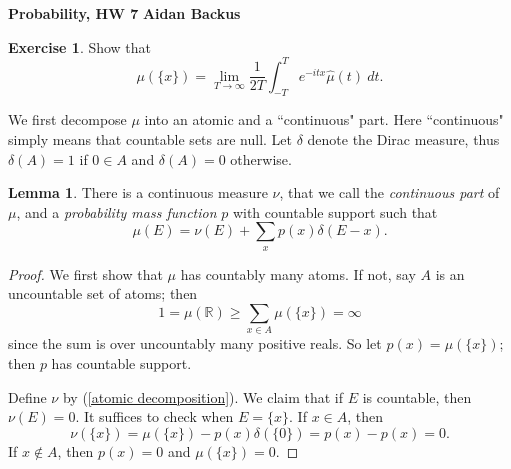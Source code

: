 \documentclass[10pt]{article}
\newcommand{\RR}{\mathbb{R}}
\theoremstyle{definition}
\newtheorem{exer}{Exercise}
\newtheorem{lemma}{Lemma}[exer]
\begin{document}
\noindent
\large\textbf{Probability, HW 7} \hfill \textbf{Aidan Backus} \\



\begin{exer}
Show that
$$\mu(\{x\}) = \lim_{T \to \infty} \frac{1}{2T} \int_{-T}^T e^{-itx} \hat \mu(t) ~dt.$$
\end{exer}

We first decompose $\mu$ into an atomic and a ``continuous" part.
Here ``continuous" simply means that countable sets are null.
Let $\delta$ denote the Dirac measure, thus $\delta(A) = 1$ if $0 \in A$ and $\delta(A) = 0$ otherwise.
\begin{lemma}
There is a continuous measure $\nu$, that we call the \emph{continuous part} of $\mu$, and a \emph{probability mass function} $p$ with countable support such that
\begin{equation}
\label{atomic decomposition}
\mu(E) = \nu(E) + \sum_x p(x) \delta(E - x).
\end{equation}
\end{lemma}
\begin{proof}
We first show that $\mu$ has countably many atoms. If not, say $A$ is an uncountable set of atoms; then
$$1 = \mu(\RR) \geq \sum_{x \in A} \mu(\{x\}) = \infty$$
since the sum is over uncountably many positive reals.
So let $p(x) = \mu(\{x\})$; then $p$ has countable support.

Define $\nu$ by (\ref{atomic decomposition}).
We claim that if $E$ is countable, then $\nu(E) = 0$.
It suffices to check when $E = \{x\}$.
If $x \in A$, then
$$\nu(\{x\}) = \mu(\{x\}) - p(x) \delta(\{0\}) = p(x) - p(x) = 0.$$
If $x \notin A$, then $p(x) = 0$ and $\mu(\{x\}) = 0$.
\end{proof}
\end{document}
